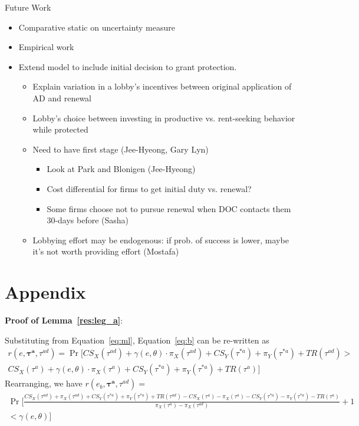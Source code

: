 \documentclass[10pt]{article}
\newcommand{\ve}{\theta}
\newcommand{\bta}{\bm{\tau^a}}
\newcommand{\tad}{\tau^{ad}}
\newcommand{\ga}{\gamma}
\begin{document}
			Future Work

\begin{itemize}
	\item Comparative static on uncertainty measure
	\item Empirical work
	\item Extend model to include initial decision to grant protection.
		\begin{itemize}
			\item Explain variation in a lobby's incentives between original application of AD and renewal
			\item Lobby's choice between investing in productive vs. rent-seeking behavior while protected
			\item Need to have first stage (Jee-Hyeong, Gary Lyn)
		\begin{itemize}
			\item Look at Park and Blonigen (Jee-Hyeong)
			\item Cost differential for firms to get initial duty vs. renewal?
			\item Some firms choose not to pursue renewal when DOC contacts them 30-days before (Sasha)
		\end{itemize}
	\item Lobbying effort may be endogenous: if prob. of success is lower, maybe it's not worth providing effort (Mostafa)
		\end{itemize}
\end{itemize}




\section{Appendix}
\label{sec:appendix}
\noindent \textbf{\hypertarget{Pr_leg_a}{Proof of Lemma~\ref{res:leg_a}}}:

Substituting from Equation~\ref{eq:ml}, Equation~\ref{eq:b} can be re-written as
\begin{multline}  
  r(e,\bta,\tad) = \Pr [ \mathit{CS}_X(\tad) + \ga(e,\ve) \cdot \pi_X(\tad) + \mathit{CS}_Y(\tau^{*a}) + \pi_Y(\tau^{*a}) + \mathit{TR}(\tad) >  \\ \mathit{CS}_X(\tau^a) + \ga(e,\ve) \cdot \pi_X(\tau^a) + \mathit{CS}_Y(\tau^{*a}) + \pi_Y(\tau^{*a}) + \mathit{TR}(\tau^a) ]
\end{multline}
Rearranging, we have $r(e_b,\bta,\tad) = $
\begin{multline}  
  \textstyle \Pr \Big[ \frac{\mathit{CS}_X(\tad) + \pi_X(\tad) + \mathit{CS}_Y(\tau^{*a}) + \pi_Y(\tau^{*a}) + \mathit{TR}(\tad)  -\mathit{CS}_X(\tau^a) - \pi_X(\tau^a) - \mathit{CS}_Y(\tau^{*a}) - \pi_Y(\tau^{*a}) - \mathit{TR}(\tau^a)}{\pi_X(\tau^a) - \pi_X(\tad)} + 1 \\ \textstyle < \ga(e,\ve) \Big]
  \label{eq:b_ex}
\end{multline}
\end{document}
